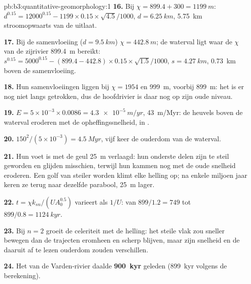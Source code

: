 \begin{solution}{pb:b3:quantitative-geomorphology:1}
\textbf{16.} Bij $\chi = 899.4 + 300 = \qty{1199}{m}$:
$d^{0.15} = 12000^{0.15} - 1199\times0.15\times\sqrt{4.5}/1000$, $d =
\qty{6.25}{km}$, \qty{5.75}{km} stroomopwaarts van de uitlaat.

\textbf{17.} Bij de samenvloeiing ($d = \qty{9.5}{km}$) $\chi = \qty{442.8}{m}$;
de waterval ligt waar de $\chi$ van de zijrivier \qty{899.4}{m} bereikt:
$s^{0.15} = 5000^{0.15} - (899.4 - 442.8)\times0.15\times\sqrt{1.5}/1000$,
$s = \qty{4.27}{km}$, \qty{0.73}{km} boven de samenvloeiing.

\textbf{18.} Hun samenvloeiingen liggen bij $\chi = 1954$ en \qty{999}{m}, voorbij
\qty{899}{m}: het  is er nog niet langs getrokken, dus de hoofdrivier is daar nog
op zijn oude niveau.

\textbf{19.} $E = 5\times10^{-3}\times0.0086 = \qty{4.3e-5}{m/yr}$,
\qty{43}{m/Myr}: de heuvels boven de waterval eroderen met de opheffingssnelheid, in
.

\textbf{20.} $150^2/(5\times10^{-3}) = \qty{4.5}{Myr}$, vijf keer de ouderdom van
de waterval.

\textbf{21.} Hun voet is met de geul \qty{25}{m} verlaagd: hun
onderste delen zijn te steil geworden en glijden misschien, terwijl hun kammen nog
met de oude snelheid eroderen. Een golf van steiler worden klimt elke helling op; na enkele
miljoen jaar keren ze terug naar dezelfde parabool, \qty{25}{m} lager.

\textbf{22.} $t = \chi k_{sn}/(U A_0^{0.5})$ varieert als $1/U$: van
$899/1.2 = 749$ tot $899/0.8 = \qty{1124}{kyr}$.

\textbf{23.} Bij $n = 2$ groeit de celeriteit met de helling: het steile
vlak zou sneller bewegen dan de trajecten eromheen en scherp blijven, maar
zijn snelheid en de daaruit af te lezen ouderdom zouden verschillen.

\textbf{24.} Het  van de Varden-rivier daalde
\textbf{\qty[text-series-to-math=true]{900}{kyr}} geleden (\qty{899}{kyr} volgens de
berekening).
\end{solution}
